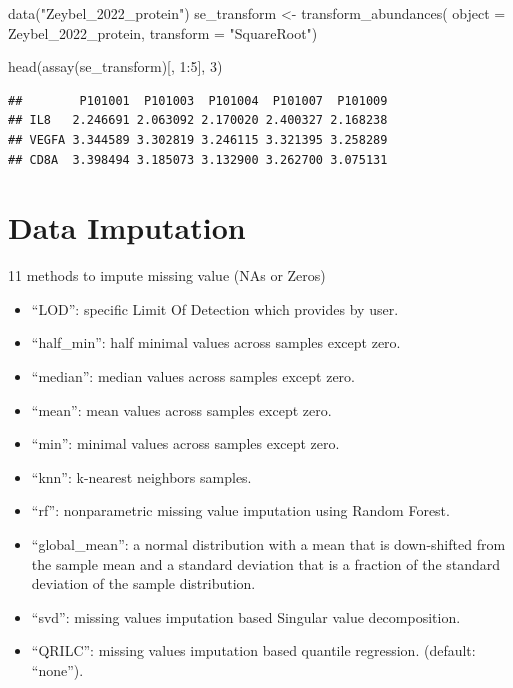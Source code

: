 \documentclass[
]{book}
\newenvironment{Shaded}{\begin{snugshade}}{\end{snugshade}}
\newcommand{\AttributeTok}[1]{\textcolor[rgb]{0.77,0.63,0.00}{#1}}
\newcommand{\DecValTok}[1]{\textcolor[rgb]{0.00,0.00,0.81}{#1}}
\newcommand{\FunctionTok}[1]{\textcolor[rgb]{0.00,0.00,0.00}{#1}}
\newcommand{\NormalTok}[1]{#1}
\newcommand{\OtherTok}[1]{\textcolor[rgb]{0.56,0.35,0.01}{#1}}
\newcommand{\SpecialCharTok}[1]{\textcolor[rgb]{0.00,0.00,0.00}{#1}}
\newcommand{\StringTok}[1]{\textcolor[rgb]{0.31,0.60,0.02}{#1}}
\begin{document}
\begin{Shaded}
\begin{Highlighting}[]
\FunctionTok{data}\NormalTok{(}\StringTok{"Zeybel\_2022\_protein"}\NormalTok{)}
\NormalTok{se\_transform }\OtherTok{\textless{}{-}} \FunctionTok{transform\_abundances}\NormalTok{(}
  \AttributeTok{object =}\NormalTok{ Zeybel\_2022\_protein,}
  \AttributeTok{transform =} \StringTok{"SquareRoot"}\NormalTok{)}

\FunctionTok{head}\NormalTok{(}\FunctionTok{assay}\NormalTok{(se\_transform)[, }\DecValTok{1}\SpecialCharTok{:}\DecValTok{5}\NormalTok{], }\DecValTok{3}\NormalTok{)}
\end{Highlighting}
\end{Shaded}

\begin{verbatim}
##        P101001  P101003  P101004  P101007  P101009
## IL8   2.246691 2.063092 2.170020 2.400327 2.168238
## VEGFA 3.344589 3.302819 3.246115 3.321395 3.258289
## CD8A  3.398494 3.185073 3.132900 3.262700 3.075131
\end{verbatim}

\hypertarget{data-imputation}{%
\section{Data Imputation}\label{data-imputation}}

11 methods to impute missing value (NAs or Zeros)

\begin{itemize}
\item
  ``LOD'': specific Limit Of Detection which provides by user.
\item
  ``half\_min'': half minimal values across samples except zero.
\item
  ``median'': median values across samples except zero.
\item
  ``mean'': mean values across samples except zero.
\item
  ``min'': minimal values across samples except zero.
\item
  ``knn'': k-nearest neighbors samples.
\item
  ``rf'': nonparametric missing value imputation using Random Forest.
\item
  ``global\_mean'': a normal distribution with a mean that is down-shifted from the sample mean and a standard deviation that is a fraction of the standard deviation of the sample distribution.
\item
  ``svd'': missing values imputation based Singular value decomposition.
\item
  ``QRILC'': missing values imputation based quantile regression. (default: ``none'').
\end{itemize}
\end{document}
